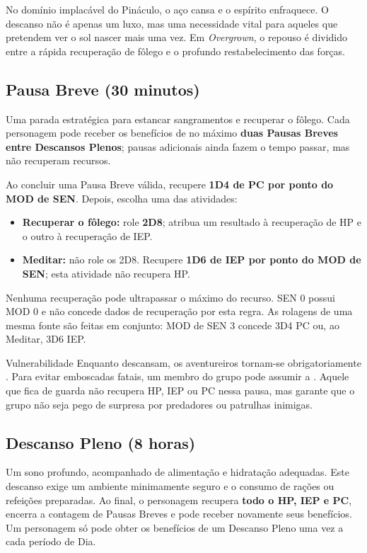 

No domínio implacável do Pináculo, o aço cansa e o espírito enfraquece. O descanso não é apenas um luxo, mas uma necessidade vital para aqueles que pretendem ver o sol nascer mais uma vez. Em \textit{Overgrown}, o repouso é dividido entre a rápida recuperação de fôlego e o profundo restabelecimento das forças.


\subsection*{Pausa Breve (30 minutos)}
Uma parada estratégica para estancar sangramentos e recuperar o fôlego. Cada personagem pode receber os benefícios de no máximo \textbf{duas Pausas Breves entre Descansos Plenos}; pausas adicionais ainda fazem o tempo passar, mas não recuperam recursos.

Ao concluir uma Pausa Breve válida, recupere \textbf{1D4 de PC por ponto do MOD de SEN}. Depois, escolha uma das atividades:

\begin{itemize}
    \item \textbf{Recuperar o fôlego:} role \textbf{2D8}; atribua um resultado à recuperação de HP e o outro à recuperação de IEP.
    \item \textbf{Meditar:} não role os 2D8. Recupere \textbf{1D6 de IEP por ponto do MOD de SEN}; esta atividade não recupera HP.
\end{itemize}

Nenhuma recuperação pode ultrapassar o máximo do recurso. SEN 0 possui MOD 0 e não concede dados de recuperação por esta regra. As rolagens de uma mesma fonte são feitas em conjunto: MOD de SEN 3 concede 3D4 PC ou, ao Meditar, 3D6 IEP.

\begin{rpgboxtips}{Vulnerabilidade}
Enquanto descansam, os aventureiros tornam-se obrigatoriamente . Para evitar emboscadas fatais, um membro do grupo pode assumir a . Aquele que fica de guarda não recupera HP, IEP ou PC nessa pausa, mas garante que o grupo não seja pego de surpresa por predadores ou patrulhas inimigas.
\end{rpgboxtips}

\subsection*{Descanso Pleno (8 horas)}
Um sono profundo, acompanhado de alimentação e hidratação adequadas. Este descanso exige um ambiente minimamente seguro e o consumo de rações ou refeições preparadas. Ao final, o personagem recupera \textbf{todo o HP, IEP e PC}, encerra a contagem de Pausas Breves e pode receber novamente seus benefícios. Um personagem só pode obter os benefícios de um Descanso Pleno uma vez a cada período de Dia.

